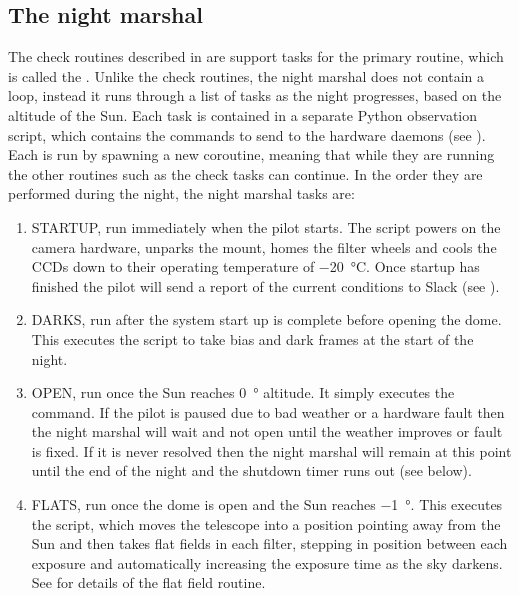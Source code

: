 \subsection{The night marshal}
\label{sec:night_marshal}
\begin{colsection}

The check routines described in  are support tasks for the primary routine, which is called the . Unlike the check routines, the night marshal does not contain a loop, instead it runs through a list of tasks as the night progresses, based on the altitude of the Sun. Each task is contained in a separate Python observation script, which contains the commands to send to the hardware daemons (see ). Each is run by spawning a new coroutine, meaning that while they are running the other routines such as the check tasks can continue. In the order they are performed during the night, the night marshal tasks are:

\begin{enumerate}

\item STARTUP, run immediately when the pilot starts. The  script powers on the camera hardware, unparks the mount, homes the filter wheels and cools the CCDs down to their operating temperature of \SI{-20}{\celsius}. Once startup has finished the pilot will send a report of the current conditions to Slack (see ).

\item DARKS, run after the system start up is complete before opening the dome. This executes the  script to take bias and dark frames at the start of the night.

\item OPEN, run once the Sun reaches \SI{0}{\degree} altitude. It simply executes the  command. If the pilot is paused due to bad weather or a hardware fault then the night marshal will wait and not open until the weather improves or fault is fixed. If it is never resolved then the night marshal will remain at this point until the end of the night and the shutdown timer runs out (see below).

\item FLATS, run once the dome is open and the Sun reaches \SI{-1}{\degree}. This executes the  script, which moves the telescope into a position pointing away from the Sun and then takes flat fields in each filter, stepping in position between each exposure and automatically increasing the exposure time as the sky darkens. See  for details of the flat field routine.


\end{enumerate}
\end{colsection}
